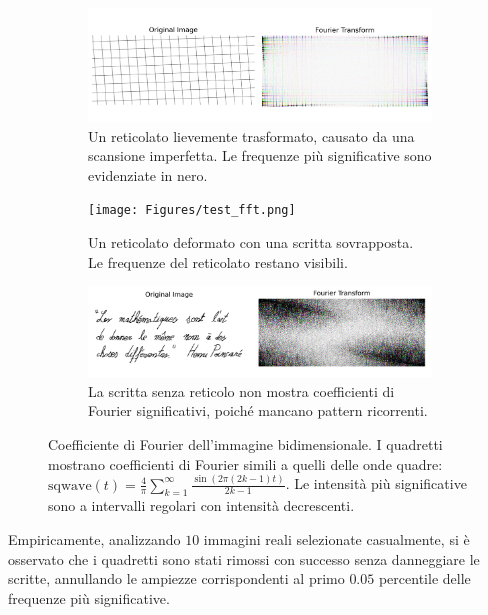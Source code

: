     \begin{figure}
    	\centering
    	\begin{subfigure}[t]{\linewidth}
    		\includegraphics[width=\linewidth]{Figures/grid_fft.png} \caption{Un reticolato lievemente trasformato, causato da una scansione imperfetta. Le frequenze più significative sono evidenziate in nero.} \label{fig:synthetic_grid_fft}
    	\end{subfigure}
    	\begin{subfigure}[t]{\linewidth}
    		\texttt{[image: Figures/test\_fft.png]} \caption{Un reticolato deformato con una scritta sovrapposta. Le frequenze del reticolato restano visibili.} \label{fig:synthetic_sign_fft}
    	\end{subfigure} \begin{subfigure}[t]{\linewidth}
    		\includegraphics[width=\linewidth]{Figures/clean_fft.png} \caption{La scritta senza reticolo non mostra coefficienti di Fourier significativi, poiché mancano pattern ricorrenti.} \label{fig:synthetic_clean_fft}
    	\end{subfigure}
    	\caption[Synthetic FFT test]{Coefficiente di Fourier dell'immagine bidimensionale. I quadretti mostrano coefficienti di Fourier simili a quelli delle onde quadre: $\text{sqwave}(t) = \frac{4}{\pi}\sum_{k=1}^{\infty}\frac{\sin\left(2\pi(2k-1)t\right)}{2k-1}$. Le intensità più significative sono a intervalli regolari con intensità decrescenti.}
    \end{figure}

    \noindent Empiricamente, analizzando $10$ immagini reali selezionate casualmente, si è osservato che i quadretti sono stati rimossi con successo senza danneggiare le scritte, annullando le ampiezze corrispondenti al primo $0.05$ percentile delle frequenze più significative.

